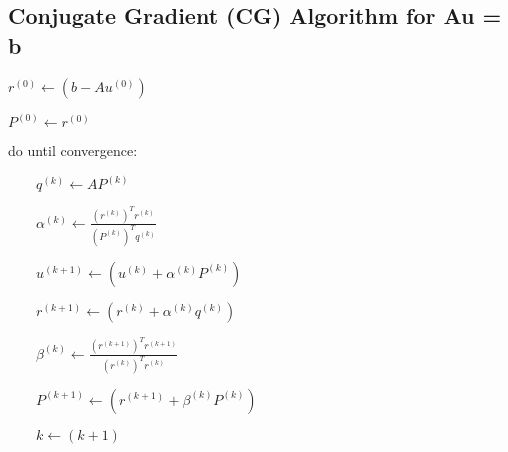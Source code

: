 \documentclass[11pt]{article}
\begin{document}
    \hypertarget{conjugate-gradient-cg-algorithm-for-au-b}{%
\subsection{Conjugate Gradient (CG) Algorithm for Au =
b}\label{conjugate-gradient-cg-algorithm-for-au-b}}

    \(r^{(0)} \leftarrow (b - Au^{(0)})\)

    \(P^{(0)} \leftarrow r^{(0)}\)

    do until convergence:

    \(\qquad q^{(k)} \leftarrow AP^{(k)}\)

    \(\qquad \alpha^{(k)} \leftarrow \frac{(r^{(k)})^Tr^{(k)}}{(P^{(k)})^Tq^{(k)}}\)

    \(\qquad u^{(k+1)} \leftarrow (u^{(k)} + \alpha^{(k)}P^{(k)})\)

    \(\qquad r^{(k+1)} \leftarrow (r^{(k)} + \alpha^{(k)}q^{(k)})\)

    \(\qquad \beta^{(k)} \leftarrow \frac{(r^{(k+1)})^Tr^{(k+1)}}{(r^{(k)})^Tr^{(k)}}\)

    \(\qquad P^{(k+1)} \leftarrow (r^{(k+1)} + \beta^{(k)}P^{(k)})\)

    \(\qquad k \leftarrow (k+1)\)
\end{document}

